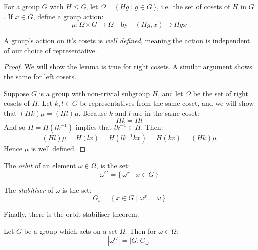 \begin{definition}
    \raggedright
    For a group \(G\) with \(H \leqslant G\), let \(\Omega = \{\,Hg \mid g \in G\,\}\), i.e.\ the set of cosets of \(H\)
    in \(G\).
    If \(x \in G\), define a group action:
    \[\mu:\Omega \times G \to \Omega \quad \text{by} \quad (Hg, x) \mapsto Hgx\]
\end{definition}

\begin{lemma}
    \raggedright
    A group's action on it's cosets is \emph{well defined}, meaning the action is independent of our choice of
    representative.
\end{lemma}

\begin{proof}
    We will show the lemma is true for right cosets.
    A similar argument shows the same for left cosets.

    Suppose \(G\) is a group with non-trivial subgroup \(H\), and let \(\Omega\) be the set of right cosets of \(H\).
    Let \(k,l \in G\) be representatives from the same coset, and we will show that \((Hk)\mu = (Hl)\mu\).
    Because \(k\) and \(l\) are in the same coset:
    \[ Hk = Hl \]
    And so \(H = H(lk^{-1})\) implies that \(lk^{-1} \in H\).
    Then:
    \[ (Hl)\mu = H(lx) = H(lk^{-1}kx) = H(kx) = (Hk)\mu \]
    Hence \(\mu\) is well defined.
\end{proof}

\begin{definition}
    \raggedright
    The \emph{orbit} of an element \(\omega \in \Omega\), is the set:
    \[\omega^G = \{\,\omega^x \mid x \in G\,\}\]

    The \emph{stabiliser} of \(\omega\) is the set:
    \[
        G_\omega = \{\, x \in G \mid \omega^x = \omega\,\}
    \]
\end{definition}

Finally, there is the orbit-stabiliser theorem:
\begin{theorem}
    Let \(G\) be a group which acts on a set \(\Omega\).
    Then for \(\omega \in \Omega\):
    \[
        |\omega^G| = |G:G_\omega|
    \]
\end{theorem}

